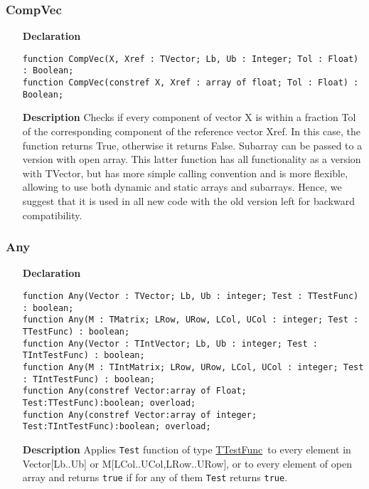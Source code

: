 \documentclass[12pt,a4paper,oneside]{report}
\newcommand{\declarationitem}[1]{\textbf{#1}}
\newcommand{\descriptiontitle}[1]{\textbf{#1}}
\newcommand{\code}[1]{\texttt{#1}}
\begin{document}
\subsubsection{CompVec}
\label{uvectutils:compvec}
\begin{itemize}
	\item[\declarationitem{Declaration}\hfill]
\begin{flushleft}\code{function CompVec(X, Xref : TVector; Lb, Ub  : Integer; Tol : Float) : Boolean;\\ \vspace{4pt}
function CompVec(constref X, Xref : array of float; Tol : Float) : Boolean; 
}
\end{flushleft}\item[\descriptiontitle{Description}]
 Checks if every component of vector X is within a fraction Tol of
the corresponding component of the reference vector Xref. In this
case, the function returns True, otherwise it returns False. Subarray can be passed to a version with open array. This latter function has all functionality as a version with TVector, but has more simple calling convention and is more flexible, allowing to use both dynamic and static arrays and subarrays. Hence, we suggest that it is used in all new code with the old version left for backward compatibility.
\end{itemize}
\subsubsection{Any}
\begin{itemize}
	\item[\declarationitem{Declaration}\hfill]
\begin{flushleft}
	\code{function Any(Vector : TVector; Lb, Ub : integer; Test : TTestFunc) : boolean;\\ \vspace{4pt}
	function Any(M : TMatrix; LRow, URow, LCol, UCol : integer; Test : TTestFunc) : boolean;\\ \vspace{4pt}
	function Any(Vector : TIntVector; Lb, Ub : integer; Test : TIntTestFunc) : boolean;\\ \vspace{4pt}
	function Any(M : TIntMatrix; LRow, URow, LCol, UCol : integer; Test : TIntTestFunc) : boolean;\\ \vspace{4pt}
	function Any(constref Vector:array of Float; Test:TTestFunc):boolean; overload;\\ \vspace{4pt}
	function Any(constref Vector:array of integer; Test:TIntTestFunc):boolean; overload;
}
\end{flushleft}	
\item[\descriptiontitle{Description}]
Applies \code{Test} function of type \hyperref[uvecutils:ttestfunc]{TTestFunc}\ to every element in Vector[Lb..Ub] or M[LCol..UCol,LRow..URow], or to every element of open array and returns \code{true} if for any of them \code{Test} returns \code{true}.
\end{itemize}
\end{document}
